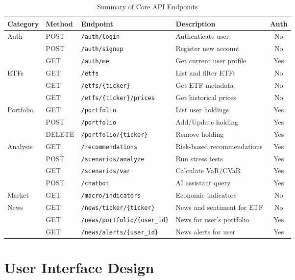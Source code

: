 \begin{table}[H]
\centering
\small
\begin{tabular}{@{}l l l l c@{}}
\toprule
\textbf{Category} & \textbf{Method} & \textbf{Endpoint} & \textbf{Description} & \textbf{Auth} \\
\midrule
Auth & POST & \texttt{/auth/login} & Authenticate user & No \\
 & POST & \texttt{/auth/signup} & Register new account & No \\
 & GET & \texttt{/auth/me} & Get current user profile & Yes \\
 \midrule
ETFs & GET & \texttt{/etfs} & List and filter ETFs & No \\
 & GET & \texttt{/etfs/\{ticker\}} & Get ETF metadata & No \\
 & GET & \texttt{/etfs/\{ticker\}/prices} & Get historical prices & No \\
 \midrule
Portfolio & GET & \texttt{/portfolio} & List user holdings & Yes \\
 & POST & \texttt{/portfolio} & Add/Update holding & Yes \\
 & DELETE & \texttt{/portfolio/\{ticker\}} & Remove holding & Yes \\
 \midrule
Analysis & GET & \texttt{/recommendations} & Risk-based recommendations & Yes \\
 & POST & \texttt{/scenarios/analyze} & Run stress tests & Yes \\
 & GET & \texttt{/scenarios/var} & Calculate VaR/CVaR & Yes \\
 & POST & \texttt{/chatbot} & AI assistant query & Yes \\
 \midrule
Market & GET & \texttt{/macro/indicators} & Economic indicators & No \\
\midrule
News & GET & \texttt{/news/ticker/\{ticker\}} & News and sentiment for ETF & No \\
 & GET & \texttt{/news/portfolio/\{user\_id\}} & News for user's portfolio & Yes \\
 & GET & \texttt{/news/alerts/\{user\_id\}} & News alerts for user & Yes \\
\bottomrule
\end{tabular}
\caption{Summary of Core API Endpoints}
\label{tab:api-endpoints}
\end{table}


\section{User Interface Design}

